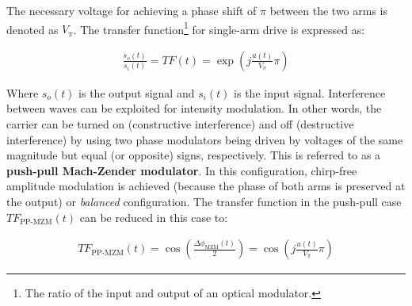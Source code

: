 The necessary voltage for achieving a phase shift of $\pi$ between the two arms is denoted as $V_\pi$. The transfer function\footnote{The ratio of the input and output of an optical modulator.} for single-arm drive is expressed as:

\begin{align}
\frac{s_o(t)}{s_i(t)} = TF(t) = \exp \left( {j\frac{u(t)}{V_{\pi}}\pi} \right)
\end{align}

Where $s_o(t)$ is the output signal and $s_i(t)$ is the input signal. Interference between waves can be exploited for intensity modulation. In other words, the carrier can be turned on (constructive interference) and off (destructive interference) by using two phase modulators being driven by voltages of the same magnitude but equal (or opposite) signs, respectively. This is referred to as a \textbf{push-pull Mach-Zender modulator}. In this configuration, chirp-free amplitude modulation is achieved (because the phase of both arms is preserved at the output) or \emph{balanced} configuration. The transfer function in the push-pull case $TF_\text{PP-MZM}(t)$ can be reduced in this case to: %






\begin{align}
TF_\text{PP-MZM}(t) = \cos \left( \frac{\Delta \phi_\text{MZM}(t)}{2} \right) = \cos \left( {j\frac{u(t)}{V_{\pi}}\pi} \right)
\end{align}

